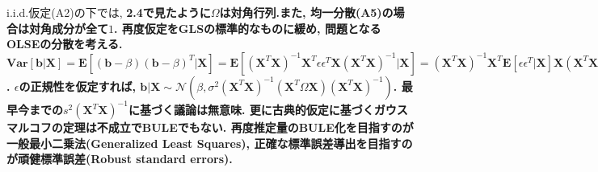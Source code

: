 \documentclass[paper=a4paper,fontsize=10pt]{jlreq}
\begin{document}
i.i.d.仮定(A2)の下では, \rmfamily\mcfamily\bfseries{2.4}\mdseries で見たように$\Omega$は対角行列.また, 均一分散(A5)の場合は対角成分が全て$1$. 再度仮定をGLSの標準的なものに緩め, 問題となるOLSEの分散を考える. $\mathbf{Var}[\mathbf{b}|\mathbf{X}]=\mathbf{E}[(\mathbf{b}-\beta)(\mathbf{b}-\beta)^T|\mathbf{X}]=\mathbf{E}[(\mathbf{X}^{T}\mathbf{X})^{-1}\mathbf{X}^{T}\epsilon\epsilon^T\mathbf{X}(\mathbf{X}^{T}\mathbf{X})^{-1}|\mathbf{X}]=(\mathbf{X}^{T}\mathbf{X})^{-1}\mathbf{X}^{T}\mathbf{E}[\epsilon\epsilon^T|\mathbf{X}]\mathbf{X}(\mathbf{X}^{T}\mathbf{X})^{-1}=\sigma^2(\mathbf{X}^{T}\mathbf{X})^{-1}(\mathbf{X}^{T}\Omega\mathbf{X})(\mathbf{X}^{T}\mathbf{X})^{-1}$. $\epsilon$の正規性を仮定すれば, $\mathbf{b}|\mathbf{X} \sim \mathcal{N}(\beta, \sigma^2(\mathbf{X}^{T}\mathbf{X})^{-1}(\mathbf{X}^{T}\Omega\mathbf{X})(\mathbf{X}^{T}\mathbf{X})^{-1})$. 最早今までの$s^2(\mathbf{X}^{T}\mathbf{X})^{-1}$に基づく議論は無意味. 更に古典的仮定に基づくガウスマルコフの定理は不成立でBULEでもない. 再度推定量のBULE化を目指すのが一般最小二乗法(Generalized Least Squares), 正確な標準誤差導出を目指すのが頑健標準誤差(Robust standard errors).\\
\end{document}
